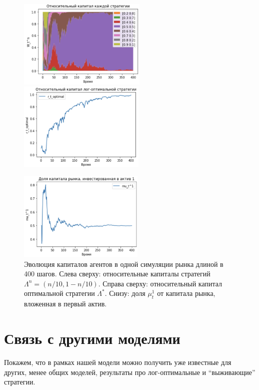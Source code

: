 \documentclass[a4paper,12pt,russian]{article} %
\theoremstyle{definition}
\begin{document}
\begin{figure}
\centering
\includegraphics[height=4.25cm]{pictures/pic1-relative-wealth-all.png}\quad
\includegraphics[height=4.25cm]{pictures/pic2-relative-wealth-optimal.png}\par
\includegraphics[height=4.25cm]{pictures/pic3-mut1-fraction.png}

\caption{\label{fig1} Эволюция капиталов агентов в одной симуляции рынка длиной в 400 шагов.
Слева сверху: относительные капиталы стратегий $\Lambda^n=(n/10, 1-n/10)$.
Справа сверху: относительный капитал оптимальной стратегии $\Lambda^*$.
Снизу: доля $\mu_{t}^1$ от капитала рынка, вложенная в первый актив.}
\end{figure}










\section{Связь с другими моделями}
\label{section5-relation-to-other-models}
Покажем, что в рамках нашей модели можно получить уже известные для других, менее общих моделей, результаты про лог-оптимальные и ``выживающие'' стратегии.
\end{document}
